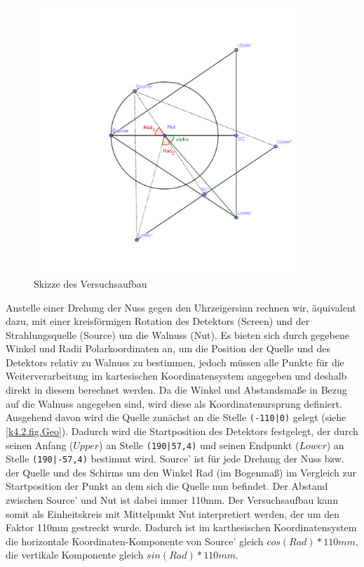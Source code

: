 \documentclass[]{dsadokumentation}
\begin{document}
\begin{figure}
    \centering
    \includegraphics[width=0.9\textwidth]{k4.2/versuchsaufbau-skizze.png}
    \caption{Skizze des Versuchsaufbau}
    \label{k4.2.fig.skizze}
\end{figure}
Anstelle einer Drehung der Nuss gegen den Uhrzeigersinn rechnen wir, äquivalent dazu, mit einer kreisförmigen Rotation des Detektors (Screen) und der Strahlungsquelle (Source) um die Walnuss (Nut). Es bieten sich durch gegebene Winkel und Radii Polarkoordinaten an, um die Position der Quelle und des Detektors relativ zu Walnuss zu bestimmen, jedoch müssen alle Punkte für die Weiterverarbeitung im kartesischen Koordinatensystem angegeben und deshalb direkt in diesem berechnet werden. Da die Winkel und Abstandsmaße in Bezug auf die Walnuss angegeben sind, wird diese als Koordinatenursprung definiert. Ausgehend davon wird die Quelle zunächst an die Stelle \verb+(-110|0)+ gelegt (siehe \cref{k4.2.fig.Geo}). Dadurch wird die Startposition des Detektors festgelegt, der durch seinen Anfang ($Upper$) an Stelle \verb+(190|57,4)+ und seinen Endpunkt ($Lower$) an Stelle \verb+(190|-57,4)+ bestimmt wird. 
Source' ist für jede Drehung der Nuss bzw. der Quelle und des Schirms um den Winkel Rad (im Bogenmaß) im Vergleich zur Startposition der Punkt an dem sich die Quelle nun befindet. Der Abstand zwischen Source' und Nut ist dabei immer 110mm. Der Versuchsaufbau kann somit als Einheitskreis mit Mittelpunkt Nut interpretiert werden, der um den Faktor 110mm gestreckt wurde. Dadurch ist im karthesischen Koordinatensystem die horizontale Koordinaten-Komponente von Source' gleich $cos(Rad) * 110mm$, die vertikale Komponente gleich $sin(Rad) * 110mm$.
\end{document}
